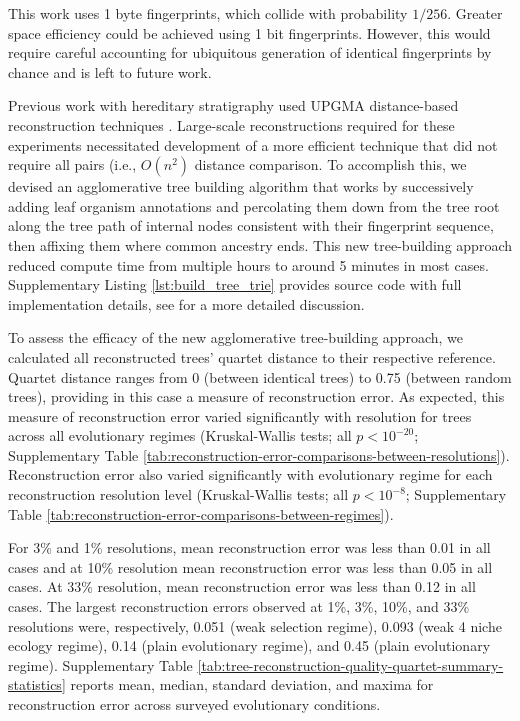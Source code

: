 This work uses 1 byte fingerprints, which collide with probability $1/256$.
Greater space efficiency could be achieved using 1 bit fingerprints.
However, this would require careful accounting for ubiquitous generation of identical fingerprints by chance and is left to future work.

Previous work with hereditary stratigraphy used UPGMA distance-based reconstruction techniques \citep{moreno2022hereditary}.
Large-scale reconstructions required for these experiments necessitated development of a more efficient technique that did not require all pairs (i.e., $O(n^2)$ distance comparison.
To accomplish this, we devised an agglomerative tree building algorithm that works by successively adding leaf organism annotations and percolating them down from the tree root along the tree path of internal nodes consistent with their fingerprint sequence, then affixing them where common ancestry ends.
This new tree-building approach reduced compute time from multiple hours to around 5 minutes in most cases.
Supplementary Listing \ref{lst:build_tree_trie} provides source code with full implementation details, see \citep{moreno2024analysis} for a more detailed discussion.



To assess the efficacy of the new agglomerative tree-building approach, we calculated all reconstructed trees' quartet distance to their respective reference.
Quartet distance ranges from 0 (between identical trees) to 0.75 (between random trees), providing in this case a measure of reconstruction error.
As expected, this measure of reconstruction error varied significantly with resolution for trees across all evolutionary regimes (Kruskal-Wallis tests; all $p < 10^{-20}$; Supplementary Table \ref{tab:reconstruction-error-comparisons-between-resolutions}).
Reconstruction error also varied significantly with evolutionary regime for each reconstruction resolution level (Kruskal-Wallis tests; all $p < 10^{-8}$; Supplementary Table \ref{tab:reconstruction-error-comparisons-between-regimes}).

For 3\% and 1\% resolutions, mean reconstruction error was less than 0.01 in all cases and at 10\% resolution mean reconstruction error was less than 0.05 in all cases.
At 33\% resolution, mean reconstruction error was less than 0.12 in all cases.
The largest reconstruction errors observed at 1\%, 3\%, 10\%, and 33\% resolutions were, respectively, 0.051 (weak selection regime), 0.093 (weak 4 niche ecology regime), 0.14 (plain evolutionary regime), and 0.45 (plain evolutionary regime).
Supplementary Table \ref{tab:tree-reconstruction-quality-quartet-summary-statistics} reports mean, median, standard deviation, and maxima for reconstruction error across surveyed evolutionary conditions.

